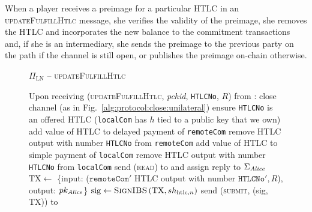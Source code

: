   When a player receives a preimage for a particular HTLC in an
  \textsc{updateFulfillHtlc} message, she verifies the validity of the preimage,
  she removes the HTLC and incorporates the new balance to the commitment
  transactions and, if she is an intermediary, she sends the preimage to the
  previous party on the path if the channel is still open, or publishes the
  preimage on-chain otherwise.

  \begin{figure}[H]
    \begin{protocolbox}{$\Pi_{\mathrm{LN}}$ -- \textsc{updateFulfillHtlc}}
      \begin{algorithmic}[1]
        \State Upon receiving (\textsc{updateFulfillHtlc}, \textit{pchid},
        \texttt{HTLCNo}, $R$) from \bob:
        \Indent
            \State close channel (as in
            Fig.~\ref{alg:protocol:close:unilateral})
            \State \Return
          \EndIf
          \State ensure \texttt{HTLCNo} is an offered HTLC (\texttt{localCom}
          has $h$ tied to a public key that we own)
          \State add value of HTLC to delayed payment of \texttt{remoteCom}
          \State remove HTLC output with number \texttt{HTLCNo} from
          \texttt{remoteCom}
          \State add value of HTLC to simple payment of \texttt{localCom}
          \State remove HTLC output with number \texttt{HTLCNo} from
          \texttt{localCom}
           
            \State send (\textsc{read}) to \ledger{} and assign reply to
            $\Sigma_{\mathit{Alice}}$
              \State $\mathrm{TX} \gets$ \{input: ($\mathtt{remoteCom}'$ HTLC
              output with number $\mathtt{HTLCNo}', R$), output:
              $pk_{\mathit{Alice}}$\}
              \State $\mathrm{sig} \gets \textsc{SignIBS}\left(\mathrm{TX},
              sh_{\mathrm{htlc}, n}\right)$
              \State send (\textsc{submit}, (sig, TX)) to \ledger{}
              \label{alg:protocol:pay:updateFulfillHtlc:submit}
            \Else \ 

\end{algorithmic}
\end{protocolbox}
\end{figure}
